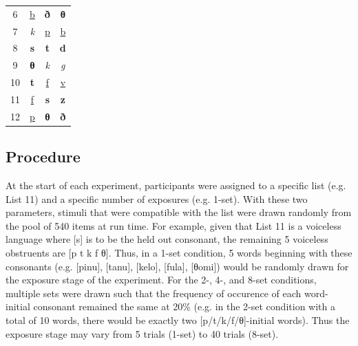 \documentclass[letterpaper,11pt]{article}
\begin{document}
\begin{table}[h]
\begin{tabular}{@{}c|c|cc@{}}
6       & {\color{cbblu}\underline{b}} & {\color{cbblu}\textbf{ð}}                            & {\color{cbred}\textbf{θ}}                             \\
7       & {\color{cbred}\emph{k}}                           & {\color{cbred}\underline{p}}                            & {\color{cbblu}\underline{b}}  \\
8       & {\color{cbred}\textbf{s}}                           & {\color{cbred}\textbf{t}}                            & {\color{cbblu}\textbf{d}} \\
9       & {\color{cbred}\textbf{θ}}                           & {\color{cbred}\emph{k}}                            & {\color{cbblu}\emph{g}}                             \\
10      & {\color{cbred}\textbf{t}}                           & {\color{cbred}\underline{f}}                            & {\color{cbblu}\underline{v}}                             \\
11      & {\color{cbred}\underline{f}}                           & {\color{cbred}\textbf{s}}                            & {\color{cbblu}\textbf{z}}                             \\
12      & {\color{cbred}\underline{p}}                           & {\color{cbred}\textbf{θ}}                            & {\color{cbblu}\textbf{ð}}                             \\
\bottomrule
\end{tabular}
\end{table}

\subsection{Procedure}

At the start of each experiment, participants were assigned to a specific list (e.g. List 11) and a specific number of exposures (e.g. 1-set).
With these two parameters, stimuli that were compatible with the list were drawn randomly from the pool of 540 items at run time.
For example, given that List 11 is a voiceless language where [s] is to be the held out consonant, the remaining 5 voiceless obstruents are [p t k f θ].
Thus, in a 1-set condition, 5 words beginning with these consonants (e.g. [pinu], [tanu], [kelo], [fula], [θomi]) would be randomly drawn for the exposure stage of the experiment.
For the 2-, 4-, and 8-set conditions, multiple sets were drawn such that the frequency of occurence of each word-initial consonant remained the same at 20\% (e.g. in the 2-set condition with a total of 10 words, there would be exactly two [p/t/k/f/θ]-initial words).
Thus the exposure stage may vary from 5 trials (1-set) to 40 trials (8-set).
\end{document}
